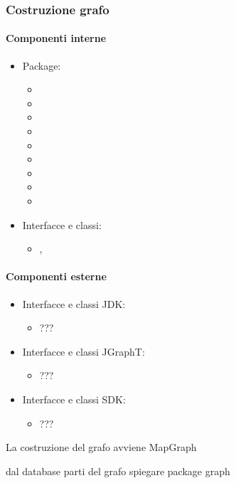 \documentclass[../Funzionalita.tex]{subfiles}
\begin{document}
			
		\subsubsection{Costruzione grafo}
		
			\paragraph*{Componenti interne}
			\begin{itemize}
			
				\item Package:
				\begin{itemize}
					\item[] \model
					\item[] \dataaccess
					\item[] \service
					\item[] \dao
					\item[] \graph
					\item[] \edge
					\item[] \vertex
					\item[] \area
					\item[] \navigationinformation
				\end{itemize}
				
				\item Interfacce e classi:
				\begin{itemize}
					\item[] \MapGraph, 
				\end{itemize}
			\end{itemize}
			
			\paragraph*{Componenti esterne}
			\begin{itemize}
			
				\item Interfacce e classi JDK:
				\begin{itemize}
					\item[]	???
				\end{itemize}
			
				\item Interfacce e classi JGraphT:
				\begin{itemize}
					\item[] ???
				\end{itemize}
				
				\item Interfacce e classi SDK:
				\begin{itemize}
					\item[]	???
				\end{itemize}
				
			\end{itemize}
			
			La costruzione del grafo avviene MapGraph
				
			dal database
			parti del grafo
			spiegare package graph
		
		
\end{document}
